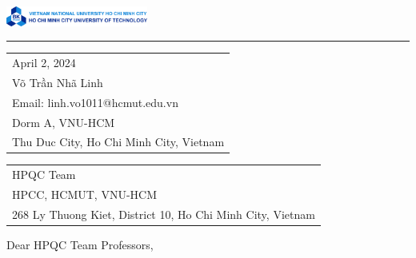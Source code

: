 \documentclass{article}
\begin{document}

\includegraphics[width=0.35\textwidth]{bk_name_en.png} %

\vspace{-1em} %

\rule{\linewidth}{1pt} %

\bigskip\bigskip %


\hfill
\begin{tabular}{l @{}}
\hfill April 2, 2024 \bigskip\\ %
\hfill Võ Trần Nhã Linh \\
\hfill Email: linh.vo1011@hcmut.edu.vn \\
\hfill Dorm A, VNU-HCM\\
\hfill Thu Duc City, Ho Chi Minh City, Vietnam \\ %
\end{tabular}

\bigskip %


\begin{tabular}{@{} l}
	HPQC Team \\
	HPCC, HCMUT, VNU-HCM \\
	268 Ly Thuong Kiet, District 10, Ho Chi Minh City, Vietnam \\
\end{tabular}

\bigskip %

Dear HPQC Team Professors,

\bigskip %

\end{document}
